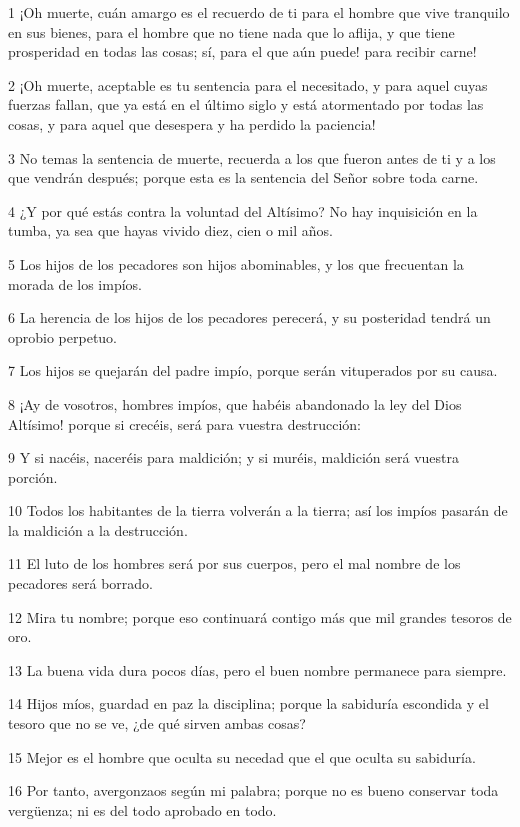 \par 1 ¡Oh muerte, cuán amargo es el recuerdo de ti para el hombre que vive tranquilo en sus bienes, para el hombre que no tiene nada que lo aflija, y que tiene prosperidad en todas las cosas; sí, para el que aún puede! para recibir carne!
\par 2 ¡Oh muerte, aceptable es tu sentencia para el necesitado, y para aquel cuyas fuerzas fallan, que ya está en el último siglo y está atormentado por todas las cosas, y para aquel que desespera y ha perdido la paciencia!
\par 3 No temas la sentencia de muerte, recuerda a los que fueron antes de ti y a los que vendrán después; porque esta es la sentencia del Señor sobre toda carne.
\par 4 ¿Y por qué estás contra la voluntad del Altísimo? No hay inquisición en la tumba, ya sea que hayas vivido diez, cien o mil años.
\par 5 Los hijos de los pecadores son hijos abominables, y los que frecuentan la morada de los impíos.
\par 6 La herencia de los hijos de los pecadores perecerá, y su posteridad tendrá un oprobio perpetuo.
\par 7 Los hijos se quejarán del padre impío, porque serán vituperados por su causa.
\par 8 ¡Ay de vosotros, hombres impíos, que habéis abandonado la ley del Dios Altísimo! porque si crecéis, será para vuestra destrucción:
\par 9 Y si nacéis, naceréis para maldición; y si muréis, maldición será vuestra porción.
\par 10 Todos los habitantes de la tierra volverán a la tierra; así los impíos pasarán de la maldición a la destrucción.
\par 11 El luto de los hombres será por sus cuerpos, pero el mal nombre de los pecadores será borrado.
\par 12 Mira tu nombre; porque eso continuará contigo más que mil grandes tesoros de oro.
\par 13 La buena vida dura pocos días, pero el buen nombre permanece para siempre.
\par 14 Hijos míos, guardad en paz la disciplina; porque la sabiduría escondida y el tesoro que no se ve, ¿de qué sirven ambas cosas?
\par 15 Mejor es el hombre que oculta su necedad que el que oculta su sabiduría.
\par 16 Por tanto, avergonzaos según mi palabra; porque no es bueno conservar toda vergüenza; ni es del todo aprobado en todo.
